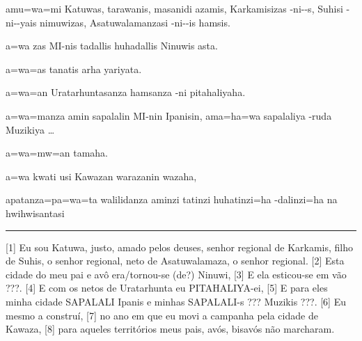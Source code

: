 \setcounter{parcount}{0}
\begin{parnumbersa}[]

	\raggedright%
	\itshape%

	amu=wa=mi Katuwas, tarawanis, masanidi azamis, Karkamisizas
	-ni--s,
	Suhisi -ni--yais nimuwizas,
	Asatuwalamanzasi -ni--is hamsis.

	a=wa zas MI-nis tadallis huhadallis Ninuwis asta.

	a=wa=as tanatis arha yariyata.

	a=wa=an Uratarhuntasanza hamsanza -ni pitahaliyaha.

	a=wa=manza amin sapalalin MI-nin Ipanisin, ama=ha=wa sapalaliya
	-ruda Muzikiya \ldots{}

	a=wa=mw=an tamaha.

	a=wa kwati usi Kawazan warazanin wazaha,


	apatanza=pa=wa=ta walilidanza aminzi tatinzi huhatinzi=ha -dalinzi=ha na hwihwisantasi


\end{parnumbersa}

\vspace{10pt}
\hrule
\vspace{10pt}

[1] Eu sou Katuwa, justo, amado pelos deuses, senhor regional de Karkamis, filho
de Suhis, o senhor regional, neto de Asatuwalamaza, o senhor regional.
	[2] Esta cidade do meu pai e avô era\slash{}tornou-se (de?) Ninuwi,
[3] E ela esticou-se em vão {???.}
[4] E com os netos de Uratarhunta eu PITAHALIYA-ei,
[5] E para eles minha cidade SAPALALI Ipanis e minhas SAPALALI-s {???} Muzikis {???}.
[6] Eu mesmo a construí,
[7] no ano em que eu movi a campanha pela cidade de Kawaza,
[8] para aqueles territórios meus pais, avós, bisavós não marcharam.


